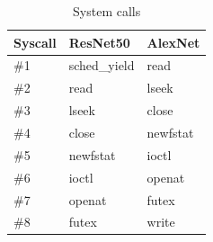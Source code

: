 \documentclass[conference]{IEEEtran}
\begin{document}


\begin{table}
    \caption{System calls}\label{tab:syscalls}
    \begin{center}
        \begin{tabular}[c]{|l|l|l|}
            \hline
            \rowcolor{gray}
            Syscall & ResNet50 & AlexNet\\
            \hline
            \rowcolor{lightgray}
            \#1 & sched\_yield & read\\
            \hline
            \#2 & read & lseek\\
            \hline
            \rowcolor{lightgray}
            \#3 & lseek & close\\
            \hline
            \#4 & close & newfstat\\
            \hline
            \rowcolor{lightgray}
            \#5 & newfstat & ioctl\\
            \hline
            \#6 & ioctl & openat\\
            \hline
            \rowcolor{lightgray}
            \#7 & openat & futex\\
            \hline
            \#8 & futex & write\\
            \hline
        \end{tabular}
    \end{center}
\end{table}
\end{document}
